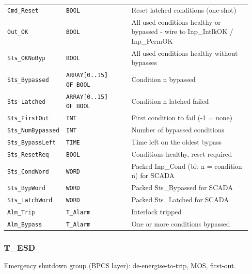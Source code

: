 {\begin{longtable}{@{}>{\raggedright\arraybackslash}p{3.4cm}>{\raggedright\arraybackslash}p{3.3cm}>{\raggedright\arraybackslash}p{1.3cm}>{\raggedright\arraybackslash}p{6.4cm}@{}}
\texttt{Cmd\_Reset} & \texttt{BOOL} &  & Reset latched conditions (one-shot) \\
\texttt{Out\_OK} & \texttt{BOOL} &  & All used conditions healthy or bypassed - wire to Inp\_IntlkOK /\allowbreak{} Inp\_PermOK \\
\texttt{Sts\_OKNoByp} & \texttt{BOOL} &  & All used conditions healthy without bypasses \\
\texttt{Sts\_Bypassed} & \texttt{ARRAY[0..15] OF BOOL} &  & Condition n bypassed \\
\texttt{Sts\_Latched} & \texttt{ARRAY[0..15] OF BOOL} &  & Condition n latched failed \\
\texttt{Sts\_FirstOut} & \texttt{INT} &  & First condition to fail (-1 = none) \\
\texttt{Sts\_NumBypassed} & \texttt{INT} &  & Number of bypassed conditions \\
\texttt{Sts\_BypassLeft} & \texttt{TIME} &  & Time left on the oldest bypass \\
\texttt{Sts\_ResetReq} & \texttt{BOOL} &  & Conditions healthy, reset required \\
\texttt{Sts\_CondWord} & \texttt{WORD} &  & Packed Inp\_Cond (bit n = condition n) for SCADA \\
\texttt{Sts\_BypWord} & \texttt{WORD} &  & Packed Sts\_Bypassed for SCADA \\
\texttt{Sts\_LatchWord} & \texttt{WORD} &  & Packed Sts\_Latched for SCADA \\
\texttt{Alm\_Trip} & \texttt{T\_Alarm} &  & Interlock tripped \\
\texttt{Alm\_Bypass} & \texttt{T\_Alarm} &  & One or more conditions bypassed \\
\bottomrule
\end{longtable}
}
\subsubsection*{T\_ESD}
\label{app:pclib:tesd}
Emergency shutdown group (BPCS layer): de-energise-to-trip, MOS, first-out.

